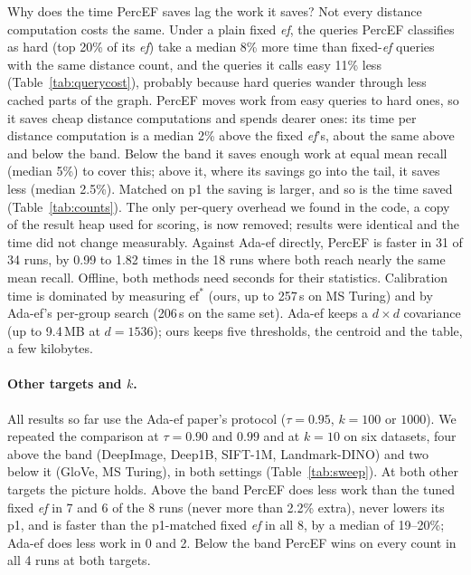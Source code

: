 \documentclass[sigconf,anonymous]{acmart}
\newcommand{\ef}{\textit{ef}}
\begin{document}
Why does the time PercEF saves lag the work it saves? Not every distance computation costs the
same. Under a plain fixed \ef{}, the queries PercEF classifies as hard (top 20\% of its \ef{}) take a
median 8\% more time than fixed-\ef{} queries with the same distance count, and the queries it calls
easy 11\% less (Table~\ref{tab:querycost}), probably because hard queries wander through less cached
parts of the graph. PercEF moves work from easy queries to hard ones, so it saves cheap distance
computations and spends dearer ones: its time per distance computation is a median 2\% above the
fixed \ef{}'s, about the same above and below the band. Below the band it saves enough work at equal
mean recall (median 5\%) to cover this; above it, where its savings go into the tail, it saves less
(median 2.5\%). Matched on p1 the saving is larger, and so is the time saved (Table~\ref{tab:counts}).
The only per-query overhead we found in the code, a copy of the result heap used for scoring, is now
removed; results were identical and the time did not change measurably. Against Ada-ef directly,
PercEF is faster in 31 of 34 runs, by 0.99 to 1.82 times in the 18 runs where both reach nearly the
same mean recall. Offline, both
methods need seconds for their statistics. Calibration time is dominated by measuring
$\mathrm{ef}^*$ (ours, up to 257\,s on MS Turing) and by Ada-ef's per-group search (206\,s on the
same set). Ada-ef keeps a $d \times d$ covariance (up to 9.4\,MB at $d = 1536$); ours keeps five
thresholds, the centroid and the table, a few kilobytes.

\paragraph{Other targets and $k$.}\label{sec:sweep}
All results so far use the Ada-ef paper's protocol ($\tau = 0.95$, $k = 100$ or $1000$). We repeated
the comparison at $\tau = 0.90$ and $0.99$ and at $k = 10$ on six datasets, four above the band
(DeepImage, Deep1B, SIFT-1M, Landmark-DINO) and two below it (GloVe, MS Turing), in both settings
(Table~\ref{tab:sweep}). At both other targets the picture holds. Above the band PercEF does less
work than the tuned fixed \ef{} in 7 and 6 of the 8 runs (never more than 2.2\% extra), never lowers
its p1, and is faster than the p1-matched fixed \ef{} in all 8, by a median of 19--20\%; Ada-ef does
less work in 0 and 2. Below the band PercEF wins on every count in all 4 runs at both targets.
\end{document}

